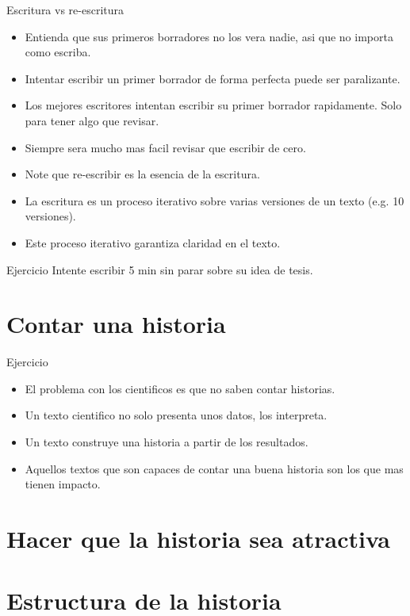 \documentclass[
10pt,
aspectratio=169,
]{beamer}
\begin{document}
\begin{frame}[c]{Escritura vs re-escritura}
\begin{itemize}
\item Entienda que sus primeros borradores no los vera nadie, asi que no importa como escriba. 
\item Intentar escribir un primer borrador de forma perfecta puede ser paralizante.
\item Los mejores escritores intentan escribir su primer borrador rapidamente. Solo para tener algo que revisar.
\item Siempre sera mucho mas facil revisar que escribir de cero. 
\item Note que re-escribir es la esencia de la escritura.
\item La escritura es un proceso iterativo sobre varias versiones de un texto (e.g. 10 versiones). 
\item Este proceso iterativo garantiza claridad en el texto. 
\end{itemize}
\end{frame}


\begin{frame}[c]{Ejercicio}
Intente escribir 5 min sin parar sobre su idea de tesis. 
\end{frame}


\section{Contar una historia}

\begin{frame}[c]{Ejercicio}
\begin{itemize}
\item El problema con los cientificos es que no saben contar historias.
\item Un texto cientifico no solo presenta unos datos, los interpreta. 
\item Un texto construye una historia a partir de los resultados.
\item Aquellos textos que son capaces de contar una buena historia son los que mas tienen impacto.

\end{itemize}
\end{frame}
\section{Hacer que la historia sea atractiva}
\section{Estructura de la historia}
\end{document}

